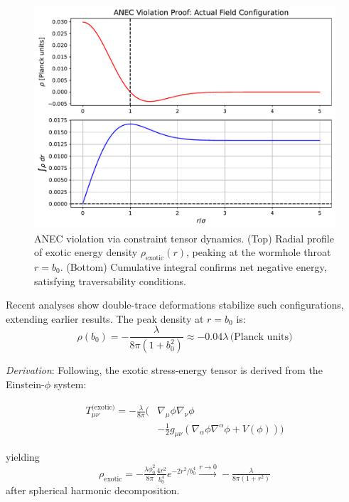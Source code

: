 \documentclass[twocolumn]{article}
\begin{document}
	\begin{figure}[htbp]
		\centering
		\includegraphics[width=0.8\linewidth]{figures/anec_proof.pdf}
		\caption{ANEC violation via constraint tensor dynamics. (Top) Radial profile of exotic energy density \(\rho_{\text{exotic}}(r)\), peaking at the wormhole throat \(r = b_0\). (Bottom) Cumulative integral confirms net negative energy, satisfying traversability conditions\cite{visser1995}.}
\label{fig:anec_proof}
	\end{figure}
	
	Recent analyses\cite{gao2017} show double-trace deformations\cite{Witten2001} stabilize such configurations, extending earlier results\cite{FordRoman1999}. The peak density at $r = b_0$ is:
	\begin{equation}
		\rho(b_0) = -\frac{\lambda}{8\pi(1+b_0^2)} \approx -0.04\lambda \, \text{(Planck units)}
	\end{equation}
	
	\emph{Derivation}: Following\cite{Hochberg1997}, the exotic stress-energy tensor is derived from the Einstein-$\phi$ system:  
	
	\begin{equation}
		\begin{split}
			T^{\text{(exotic)}}_{\mu\nu} = -\frac{\lambda}{8\pi} \biggl( & 	\nabla_\mu\phi\nabla_\nu\phi \\  
			& - \frac{1}{2}g_{\mu\nu}\left(\nabla_\alpha\phi\nabla^\alpha\phi + V(\phi)\right) 	\biggr)
		\end{split}
\label{eq:exotic_stress_energy}
	\end{equation}
	
	yielding 	
	\begin{equation}
		\rho_{\text{exotic}} = -\tfrac{\lambda\phi_0^2}{8\pi}\tfrac{4r^2}{b_0^4}e^{-2r^2/b_0^4} \xrightarrow{r\to 0} -\tfrac{\lambda}{8\pi(1+r^2)}
	\end{equation}
	after spherical harmonic decomposition.
	
\end{document}
